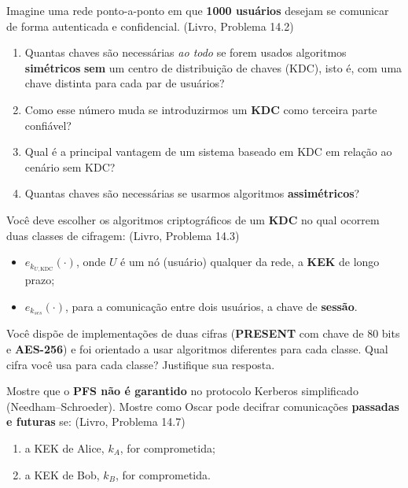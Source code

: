 \documentclass[11pt,a4paper]{article}
\newcommand{\livro}[1]{{\footnotesize\color{black!50}(Livro, Problema #1)}}
\begin{document}
\begin{exercicio}
Imagine uma rede ponto-a-ponto em que \textbf{1000 usu\'{a}rios} desejam se comunicar de forma autenticada e confidencial. \livro{14.2}
\begin{enumerate}[label=(\alph*)]
    \item Quantas chaves s\~{a}o necess\'{a}rias \emph{ao todo} se forem usados algoritmos \textbf{sim\'{e}tricos} \textbf{sem} um centro de distribui\c{c}\~{a}o de chaves (KDC), isto \'{e}, com uma chave distinta para cada par de usu\'{a}rios?
    \item Como esse n\'{u}mero muda se introduzirmos um \textbf{KDC} como terceira parte confi\'{a}vel?
    \item Qual \'{e} a principal vantagem de um sistema baseado em KDC em rela\c{c}\~{a}o ao cen\'{a}rio sem KDC?
    \item Quantas chaves s\~{a}o necess\'{a}rias se usarmos algoritmos \textbf{assim\'{e}tricos}?
\end{enumerate}
\end{exercicio}

\begin{exercicio}
Voc\^{e} deve escolher os algoritmos criptogr\'{a}ficos de um \textbf{KDC} no qual ocorrem duas classes de cifragem: \livro{14.3}
\begin{itemize}
    \item $e_{k_{U,\text{KDC}}}(\cdot)$, onde $U$ \'{e} um n\'{o} (usu\'{a}rio) qualquer da rede, a \textbf{KEK} de longo prazo;
    \item $e_{k_{ses}}(\cdot)$, para a comunica\c{c}\~{a}o entre dois usu\'{a}rios, a chave de \textbf{sess\~{a}o}.
\end{itemize}
Voc\^{e} disp\~{o}e de implementa\c{c}\~{o}es de duas cifras (\textbf{PRESENT} com chave de 80 bits e \textbf{AES-256}) e foi orientado a usar algoritmos diferentes para cada classe. Qual cifra voc\^{e} usa para cada classe? Justifique sua resposta.
\end{exercicio}

\begin{exercicio}
Mostre que o \textbf{PFS n\~{a}o \'{e} garantido} no protocolo Kerberos simplificado (Needham--Schroeder). Mostre como Oscar pode decifrar comunica\c{c}\~{o}es \textbf{passadas e futuras} se: \livro{14.7}
\begin{enumerate}[label=(\alph*)]
    \item a KEK de Alice, $k_A$, for comprometida;
    \item a KEK de Bob, $k_B$, for comprometida.
\end{enumerate}
\end{exercicio}
\end{document}

